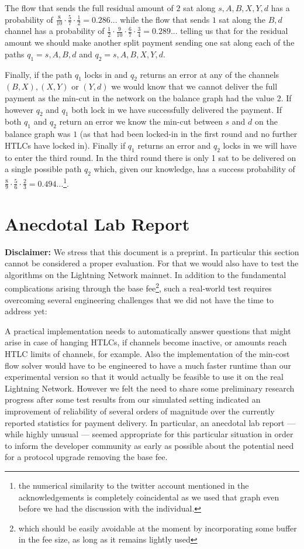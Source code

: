\documentclass[10pt,twocolumn]{article}
\begin{document}
The flow that sends the full residual amount of $2$ sat along $s,A,B,X,Y,d$ has a probability of $\frac{8}{10}\cdot\frac{5}{7}\cdot\frac{1}{2}=0.286...$ while the flow that sends $1$ sat along the $B,d$ channel has a probability of $\frac{1}{2}\cdot\frac{9}{10}\cdot\frac{6}{7}\cdot\frac{3}{4}=0.289...$ telling us that for the residual amount we should make another split payment sending one sat along each of the paths $q_1=s,A,B,d$ and $q_2=s,A,B,X,Y,d$.

Finally, if the path $q_1$ locks in and $q_2$ returns an error at any of the channels $(B,X),(X,Y)$ or $(Y,d)$ we would know that we cannot deliver the full payment as the min-cut in the network on the balance graph had the value $2$.
If however $q_2$ and $q_1$ both lock in we have successfully delivered the payment.
If both $q_1$ and $q_2$ return an error we know the min-cut between $s$ and $d$ on the balance graph was $1$ (as that had been locked-in in the first round and no further HTLCs have locked in).
Finally if $q_1$ returns an error and $q_2$ locks in we will have to enter the third round.
In the third round there is only 1 sat to be delivered on a single possible path $q_2$ which, given our knowledge, has a success probability of $\frac{8}{9}\cdot\frac{5}{6}\cdot\frac{2}{3}=0.494\ldots$\footnote{the numerical similarity to the twitter account mentioned in the acknowledgements is completely coincidental as we used that graph even before we had the discussion with the individual.}.


\section{Anecdotal Lab Report}
\textbf{Disclaimer:} We stress that this document is a preprint. In particular this section cannot be considered a proper evaluation. For that we would also have to test the algorithms on the Lightning Network mainnet.
In addition to the fundamental complications arising through the base fee\footnote{which should be easily avoidable at the moment by incorporating some buffer in the fee size, as long as it remains lightly used}, such a real-world test requires overcoming several engineering challenges that we did not have the time to address yet:

A practical implementation needs to automatically answer questions that might arise in case of hanging HTLCs, if channels become inactive, or amounts reach HTLC limits of channels, for example.
Also the implementation of the min-cost flow solver would have to be engineered to have a much faster runtime than our experimental version so that it would actually be feasible to use it on the real Lightning Network.
However we felt the need to share some preliminary research progress after some test results from our simulated setting indicated an improvement of reliability of several orders of magnitude over the currently reported statistics for payment delivery.
In particular, an anecdotal lab report --- while highly unusual --- seemed appropriate for this particular situation in order to inform the developer community as early as possible about the potential need for a protocol upgrade removing the base fee.
\end{document}
